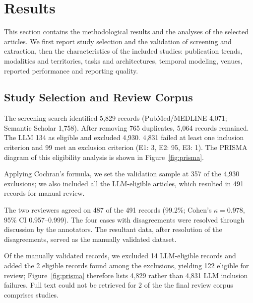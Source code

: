 \section{Results}
\label{sec:analysis}
\label{sec:results}
This section contains the methodological results and the analyses of the selected articles. We first report study selection and the validation of screening and extraction, then the characteristics of the  included studies: publication trends, modalities and territories, tasks and architectures, temporal modeling, venues, reported performance and reporting quality.

\subsection{Study Selection and Review Corpus}
The screening search identified 5,829 records (PubMed/\allowbreak MEDLINE 4,071; Semantic Scholar 1,758). After removing 765 duplicates, 5,064 records remained. The LLM  134 as eligible and excluded 4,930. 4,831 failed at least one inclusion criterion and 99 met an exclusion criterion (E1: 3, E2: 95, E3: 1). The PRISMA diagram of this eligibility analysis is shown in Figure~\ref{fig:prisma}.

Applying Cochran's \cite{cochran1977sampling} formula, we set the validation sample at 357 of the 4,930 exclusions; we also included all the LLM-eligible articles, which resulted in 491 records for manual review.

The two reviewers agreed on 487 of the 491 records (99.2\%; Cohen's $\kappa=0.978$, 95\% CI 0.957--0.999). The four cases with disagreements were resolved through discussion by the annotators. The resultant data, after resolution of the disagreements, served as the manually validated dataset.

Of the manually validated records, we excluded 14 LLM-eligible records and added the 2 eligible records found among the exclusions, yielding 122 eligible  for review; Figure~\ref{fig:prisma} therefore lists 4,829 rather than 4,831 LLM inclusion failures. Full text could not be retrieved for 2 of  the   the  final review corpus  comprises  studies. 

